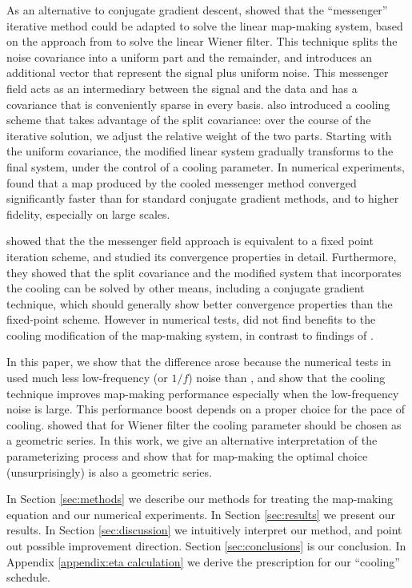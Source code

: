 \documentclass[twocolumn,linenumbers]{aastex631}
\begin{document}
As an alternative to conjugate gradient descent, \citet{Huffenberger_2018} showed that the ``messenger'' iterative method could be adapted to solve the linear map-making system, based on the  approach from \cite{2013A&A...549A.111E} to solve the linear Wiener filter.  This technique splits the noise covariance into a uniform part and the remainder, and introduces an additional vector that represent the signal plus uniform noise.  This messenger field acts as an intermediary between the signal and the data and has a covariance that is conveniently sparse in every basis.  \cite{2013A&A...549A.111E} also introduced a cooling scheme that takes  advantage of the split covariance: over the course of the iterative solution, we adjust the relative weight of the two parts.  Starting with the uniform covariance, the modified linear system gradually transforms to the final system, under the control of a cooling parameter.  In numerical experiments, \citet{Huffenberger_2018} found that a map produced by the cooled messenger method converged significantly faster than for standard conjugate gradient methods, and to higher fidelity, especially on large scales.  

\citet{2018A&A...620A..59P} showed that the the messenger field approach is equivalent to a fixed point iteration scheme, and studied its convergence properties in detail.  Furthermore, they showed that the split covariance and the modified system that incorporates the cooling can be solved by other means, including a conjugate gradient technique, which should generally show better convergence properties than the fixed-point scheme. However in numerical tests, \citet{2018A&A...620A..59P} did not find benefits to the cooling modification of the map-making system, in contrast to findings of \citet{Huffenberger_2018}.

In this paper, we show that the difference arose because the numerical tests in \citet{2018A&A...620A..59P} used much less low-frequency (or $1/f$) noise than \citet{Huffenberger_2018}, and show that the cooling technique improves map-making performance especially when the low-frequency noise is large.  This performance boost depends on a proper choice for the pace of cooling.  \citet{2017MNRAS.468.1782K} showed that for Wiener filter the cooling parameter should be chosen as a geometric series.  In this work, we give an alternative interpretation of the parameterizing process and show that for map-making the optimal choice (unsurprisingly) is also a geometric series.


In Section \ref{sec:methods} we describe our methods for treating the map-making equation and our numerical experiments.
In Section \ref{sec:results} we present our results. 
In Section \ref{sec:discussion} we intuitively interpret our method, and point out possible improvement direction.
Section \ref{sec:conclusions} is our conclusion.
In Appendix \ref{appendix:eta calculation} we derive the prescription for our ``cooling'' schedule.
\end{document}
